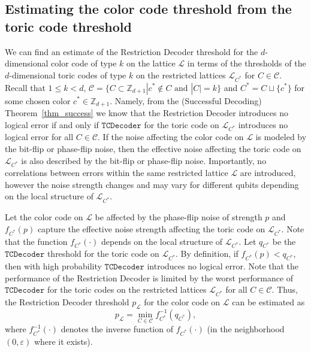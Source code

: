 \documentclass[onecolumn,letterpaper,11pt,accepted=2022-12-19]{quantumarticle}
\theoremstyle{definition}
\theoremstyle{lemma}
\theoremstyle{theorem}
\theoremstyle{corollary}
\begin{document}
{\subsection{Estimating the color code threshold from the toric code threshold}
\label{sec_threshold_estimate}


We can find an estimate of the Restriction Decoder threshold for the $d$-dimensional color code of type $k$ on the lattice $\mathcal{L}$ in terms of the thresholds of the $d$-dimensional toric codes of type $k$ on the restricted lattices $\mathcal{L}_{C^*}$ for $C\in\mathcal{C}$.
Recall that $1\leq k <d$, $\mathcal{C} = \{ C \subset\mathbb{Z}_{d+1} | c^* \not\in C \textrm{ and } |C| = k \}$ and $C^* = C \sqcup \{ c^* \}$ for some chosen color $c^*\in\mathbb{Z}_{d+1}$.
Namely, from the (Successful Decoding) Theorem~\ref{thm_success} we know that the Restriction Decoder introduces no logical error if and only if $\mathtt{TCDecoder}$ for the toric code on $\mathcal{L}_{C^*}$ introduces no logical error for all $C\in\mathcal{C}$.
If the noise affecting the color code on $\mathcal{L}$ is modeled by the bit-flip or phase-flip noise, then the effective noise affecting the toric code on $\mathcal{L}_{C^*}$ is also described by the bit-flip or phase-flip noise.
Importantly, no correlations between errors within the same restricted lattice $\mathcal{L}$ are introduced, however the noise strength changes and may vary for different qubits depending on the local structure of $\mathcal{L}_{C^*}$.


Let the color code on $\mathcal{L}$ be affected by the phase-flip noise of strength $p$ and $f_{C^*}(p)$ capture the effective noise strength affecting the toric code on $\mathcal{L}_{C^*}$.
Note that the function $f_{C^*}(\cdot)$ depends on the local structure of $\mathcal{L}_{C^*}$.
Let $q_{C^*}$ be the $\mathtt{TCDecoder}$ threshold for the toric code on $\mathcal{L}_{C^*}$.
By definition, if $f_{C^*}(p) < q_{C^*}$, then with high probability $\mathtt{TCDecoder}$ introduces no logical error.
Note that the performance of the Restriction Decoder is limited by the worst performance of $\mathtt{TCDecoder}$ for the toric codes on the restricted lattices $\mathcal{L}_{C^*}$ for all $C\in\mathcal{C}$.
Thus, the Restriction Decoder threshold $p_{\mathcal{L}}$ for the color code on $\mathcal{L}$ can be estimated as
\begin{equation}
\label{eq_threshold_estimate}
p_{\mathcal{L}} = \min_{C\in\mathcal C } f^{-1}_{C^*} (q_{C^*}),
\end{equation}
where $f^{-1}_{C^*}(\cdot)$ denotes the inverse function of $f_{C^*}(\cdot)$ (in the neighborhood $(0,\varepsilon)$ where it exists).



}
\end{document}
